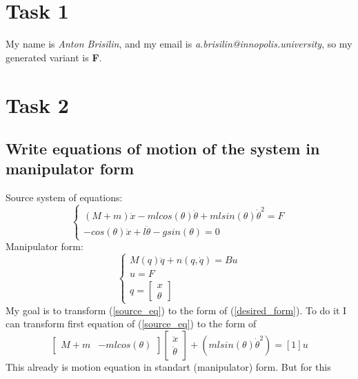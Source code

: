 \documentclass[a4paper,12pt]{article}
\begin{document}
\section{Task 1}
My name is \textit{Anton Brisilin}, and my email is 
\textit{a.brisilin@innopolis.university}, so my generated variant is \textbf{F}.
\section{Task 2}
    \subsection{Write equations of motion of the system in manipulator form}
    Source system of equations:
    \begin{equation}\label{source_eq}
        \begin{cases}
            (M+m)\ddot{x}-mlcos(\theta)\ddot{\theta}+mlsin(\theta)\dot\theta^2=F\\
            -cos(\theta)\ddot{x}+l\ddot{\theta}-gsin(\theta)=0
        \end{cases}
    \end{equation}
    Manipulator form:
    \begin{equation}
        \begin{cases}\label{desired_form}
            M(q)\ddot{q}+n(q,\dot{q})=Bu\\
            u=F\\
            q=\begin{bmatrix}x \\ \theta\end{bmatrix}
        \end{cases}
    \end{equation}
    My goal is to transform (\ref{source_eq}) to the form of (\ref{desired_form}). 
    To do it I can transform first equation of (\ref{source_eq}) to the form of
    \begin{equation}\label{first_part}
        \begin{bmatrix}
            M+m & -mlcos(\theta)
        \end{bmatrix}
        \begin{bmatrix}
            \ddot x \\ 
            \ddot\theta
        \end{bmatrix}
         + (mlsin(\theta)\dot\theta^2) = [1]u
    \end{equation}
    This already is motion equation in standart (manipulator) form. But for this
\end{document}
